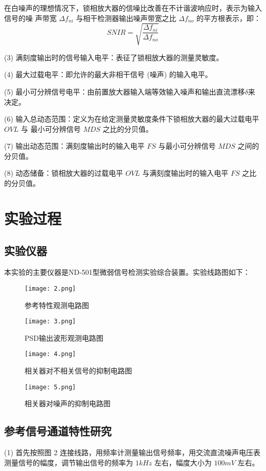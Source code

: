 \documentclass{whureport}
\begin{document}
\begin{multicols}{2}
在白噪声的理想情况下，锁相放大器的信噪比改善在不计谐波响应时，表示为输入信号的噪
声带宽 $\Delta f_{ni}$ 与相干检测器输出噪声带宽之比 $\Delta f_{no}$ 的平方根表示，即：
\begin{equation}
    SNIR = \sqrt{\frac{\Delta f_{ni}}{\Delta f_{no}}}
\end{equation}

(3) 满刻度输出时的信号输入电平：表征了锁相放大器的测量灵敏度。

(4) 最大过载电平：即允许的最大非相干信号 (噪声) 的输入电平。

(5) 最小可分辨信号电平：由前置放大器输入端等效输入噪声和输出直流漂移$\delta$来决定。

(6) 输入总动态范围：定义为在给定测量灵敏度条件下锁相放大器的最大过载电平 $OVL$ 与
    最小可分辨信号 $MDS$ 之比的分贝值。

(7) 输出动态范围：满刻度输出时的输入电平 $FS$ 与最小可分辨信号 $MDS$ 之间的分贝值。

(8) 动态储备：锁相放大器的过载电平 $OVL$ 与满刻度输出时的输入电平 $FS$ 之比的分贝值。
\section{实验过程}
\subsection{实验仪器}
本实验的主要仪器是ND-501型微弱信号检测实验综合装置。实验线路图如下：
\begin{figure}[H]
	\centering
	\texttt{[image: 2.png]}
	\caption{参考特性观测电路图}	
	\label{circuit1}
\end{figure}
\begin{figure}[H]
	\centering
	\texttt{[image: 3.png]}
	\caption{PSD输出波形观测电路图}
	\label{circuit2}
\end{figure}
\begin{figure}[H]
	\centering
	\texttt{[image: 4.png]}
	\caption{相关器对不相关信号的抑制电路图}
	\label{circuit3}
\end{figure}
\begin{figure}[H]
	\centering
	\texttt{[image: 5.png]}
	\caption{相关器对噪声的抑制电路图}
	\label{circuit4}
\end{figure}

\subsection{参考信号通道特性研究}
(1) 首先按照图 2 连接线路，用频率计测量输出信号频率，用交流直流噪声电压表测量信号的幅度，调节输出信号的频率为 $1kHz$ 左右，幅度大小为 $100mV$ 左右。


\end{multicols}
\end{document}
